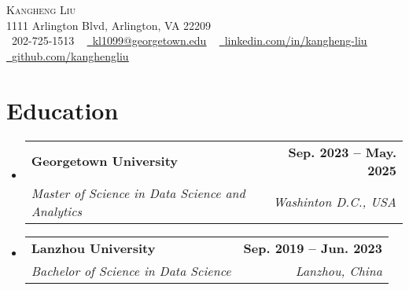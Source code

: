 \documentclass[letterpaper,11pt]{article}
\makeatletter
\newcommand{\resumeSubheading}[4]{
  \vspace{-2pt}\item
    \begin{tabular*}{1.0\textwidth}[t]{l@{\extracolsep{\fill}}r}
      \textbf{#1} & \textbf{\small #2} \\
      \textit{\small#3} & \textit{\small #4} \\
    \end{tabular*}\vspace{-7pt}
}
\newcommand{\resumeSubHeadingListStart}{\begin{itemize}[leftmargin=0.0in, label={}]}
\newcommand{\resumeSubHeadingListEnd}{\end{itemize}}
\makeatother
\begin{document}

\begin{center}
    {\Huge \scshape Kangheng Liu} \\ \vspace{1pt}
    1111 Arlington Blvd, Arlington, VA 22209 \\ \vspace{1pt}
    \small \raisebox{-0.1\height}\faPhone\ 202-725-1513 ~ \href{mailto:kl1099@georgetown.edu}{\raisebox{-0.2\height}\faEnvelope\  \underline{kl1099@georgetown.edu}} ~
    \href{https://www.linkedin.com/in/kangheng-liu/}{\raisebox{-0.2\height}\faLinkedin\ \underline{linkedin.com/in/kangheng-liu}}  ~
    \href{https://github.com/kanghengliu}{\raisebox{-0.2\height}\faGithub\ \underline{github.com/kanghengliu}}
    \vspace{-8pt}
\end{center}


\section{Education}
  \resumeSubHeadingListStart
    \resumeSubheading
      {Georgetown University}{Sep. 2023 -- May. 2025}
      {Master of Science in Data Science and Analytics}{Washinton D.C., USA}
    \resumeSubheading
      {Lanzhou University}{Sep. 2019 -- Jun. 2023}
      {Bachelor of Science in Data Science}{Lanzhou, China}
  \resumeSubHeadingListEnd
\end{document}
